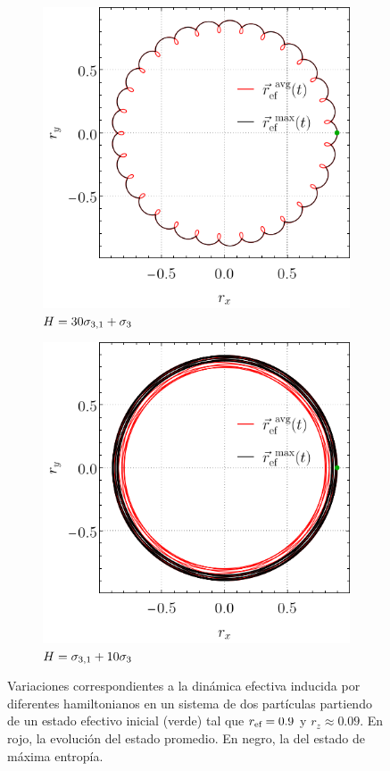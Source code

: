 \begin{figure}[ht!]
    \centering
    \begin{subfigure}{0.5\textwidth}
      \centering
      \includegraphics[width=0.8\linewidth]{appendices/figures/local_AvgVSMax_p2=0.1_r=0.9_w1=30_w2=1.png}
      \caption{$H=30\sigma_{3,1}+\sigma_{3}$}
    \end{subfigure}%
    \begin{subfigure}{0.5\textwidth}
      \centering
      \includegraphics[width=0.8\linewidth]{appendices/figures/local_AvgVSMax_p2=0.1_r=0.9_w1=1_w2=10.png}
      \caption{$H=\sigma_{3,1}+10\sigma_{3}$}
    \end{subfigure}
    \caption{Variaciones correspondientes a la dinámica efectiva inducida por diferentes hamiltonianos en un sistema de dos partículas partiendo de un estado efectivo inicial (verde) tal que $r_{\text{ef}}=0.9$ y $r_{z}\approx0.09$. En rojo, la evolución del estado promedio. En negro, la del estado de máxima entropía. \label{ap:EffDunAVGvsMaxEnt2}}
\end{figure}

